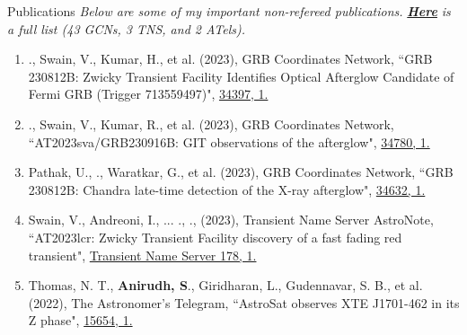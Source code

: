 \begin{rSection}{Publications}
\hspace{-1em} \textit{Below are some of my important non-refereed publications.} \href{https://ui.adsabs.harvard.edu/search/filter_database_fq_database=AND&filter_database_fq_database=database%3A%22astronomy%22&filter_property_fq_property=AND&filter_property_fq_property=property%3A%22notrefereed%22&fq=%7B!type%3Daqp%20v%3D%24fq_database%7D&fq=%7B!type%3Daqp%20v%3D%24fq_property%7D&fq_database=(database%3A%22astronomy%22)&fq_property=(property%3A%22notrefereed%22)&p_=0&q=Anirudh%20Salgundi&sort=date%20desc%2C%20bibcode%20desc}{\textbf{\textit{Here}}} \textit{is a full list (43 GCNs, 3 TNS, and 2 ATels).}
\vspace{-1.5em}
\begin{enumerate}[itemsep=-0.5em, leftmargin=0.5em] %
\item \me., Swain, V., Kumar, H., et al. (2023), GRB Coordinates Network, {``GRB 230812B: Zwicky Transient Facility Identifies Optical Afterglow Candidate of Fermi GRB (Trigger 713559497)"}, \href{https://gcn.nasa.gov/circulars/34397}{34397, 1.}
\item \me., Swain, V., Kumar, R., et al. (2023), GRB Coordinates Network, {``AT2023sva/GRB230916B: GIT observations of the afterglow"}, \href{https://gcn.nasa.gov/circulars/34780}{34780, 1.}
\item Pathak, U., \me., Waratkar, G., et al. (2023), GRB Coordinates Network, {``GRB 230812B: Chandra late-time detection of the X-ray afterglow"}, \href{https://gcn.nasa.gov/circulars/34632}{34632, 1.}
\item Swain, V., Andreoni, I., ... ., \me., (2023), Transient Name Server AstroNote, {``AT2023lcr: Zwicky Transient Facility discovery of a fast fading red transient"}, \href{https://www.wis-tns.org/astronotes/astronote/2023-178}{Transient Name Server 178, 1.}
\item Thomas, N. T., \textbf{Anirudh, S}., Giridharan, L., Gudennavar, S. B., et al. (2022), The Astronomer's Telegram, {``AstroSat observes XTE J1701-462 in its Z phase"}, \href{https://www.astronomerstelegram.org/?read=15654}{15654, 1.}
\end{enumerate}
\end{rSection}
